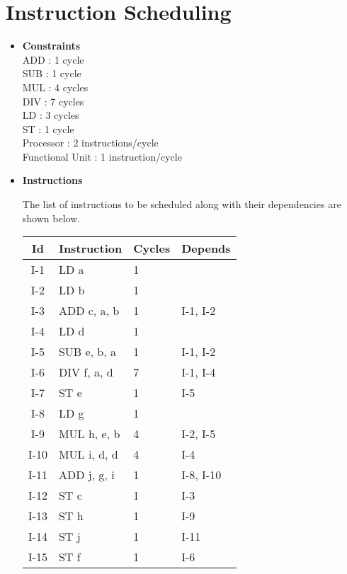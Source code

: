 \section{Instruction Scheduling}

\begin{itemize}

\item \textbf{Constraints} \\
  ADD : 1 cycle \\
  SUB : 1 cycle \\
  MUL : 4 cycles \\
  DIV : 7 cycles \\
  LD  : 3 cycles \\
  ST  : 1 cycle \\

  Processor : 2 instructions/cycle \\
  Functional Unit : 1 instruction/cycle \\

\item \textbf{Instructions}

  The list of instructions to be scheduled along with their dependencies are shown below.
  
\begin{table}
\centering
\begin{tabular}{c|l|l|l}
  \toprule
  \toprule
  \textbf{Id} & \textbf{Instruction} & \textbf{Cycles} & \textbf{Depends} \\
  \midrule
  I-1   &  LD a         & 1  &          \\ \hline
  I-2   &  LD b         & 1  &          \\ \hline
  I-3   &  ADD c, a, b  & 1  & I-1, I-2 \\ \hline
  I-4   &  LD d         & 1  &          \\ \hline
  I-5   &  SUB e, b, a  & 1  & I-1, I-2 \\ \hline
  I-6   &  DIV f, a, d  & 7  & I-1, I-4 \\ \hline
  I-7   &  ST e         & 1  & I-5      \\ \hline
  I-8   &  LD g         & 1  &          \\ \hline
  I-9   &  MUL h, e, b  & 4  & I-2, I-5 \\ \hline
  I-10  &  MUL i, d, d  & 4  & I-4      \\ \hline
  I-11  &  ADD j, g, i  & 1  & I-8, I-10 \\ \hline
  I-12  &  ST c         & 1  & I-3      \\ \hline
  I-13  &  ST h         & 1  & I-9      \\ \hline
  I-14  &  ST j         & 1  & I-11     \\ \hline
  I-15  &  ST f         & 1  & I-6      \\ \hline
  \bottomrule
\end{tabular}
\end{table}  
  

\end{itemize}
